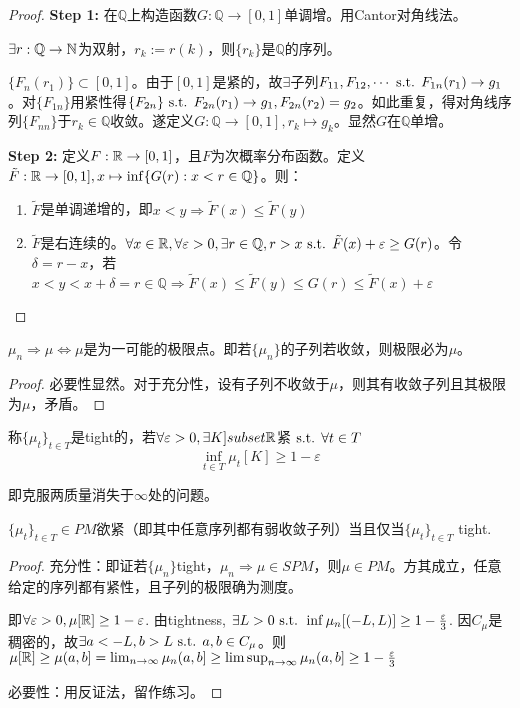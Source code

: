 \documentclass{ctexart}
\begin{document}
\begin{proof}
  \textbf{Step 1: } 在$\mathbb{Q}$上构造函数$G:\mathbb{Q}\to [0,1]$单调增。用Cantor对角线法。

  $\exists r:\mathbb{Q}\to \mathbb{N}$为双射，$r_{k}:=r(k)$，则$\{r_{k}\}$是$\mathbb{Q}$的序列。

  $\{F_{n}(r_{1})\}\subset [0,1]$。由于$[0,1]$是紧的，故$\exists $子列$F_{11},F_{12},\cdots\text{ s.t. } F_{1n}(r_{1})\to g_{1}$。对$\{F_{1n}\}$用紧性得$\{F_{2n}\}\text{ s.t. } F_{2n}(r_{1})\to g_{1},F_{2n}(r_{2})=g_{2}$。如此重复，得对角线序列$\{F_{nn}\}$于$r_{k}\in\mathbb{Q}$收敛。遂定义$G:\mathbb{Q}\to [0,1],r_{k}\mapsto g_{k}$。显然$G$在$\mathbb{Q}$单增。

\textbf{Step 2: } 定义$F:\mathbb{R}\to[0,1]$，且$F$为次概率分布函数。定义$\tilde{F}:\mathbb{R}\to [0,1],x\mapsto \inf\{G(r):x<r\in\mathbb{Q}\}$。则：
\begin{enumerate}
\item $\tilde{F}$是单调递增的，即$x<y\Rightarrow \tilde{F}(x)\leq \tilde{F}(y)$
\item $\tilde{F}$是右连续的。$\forall x\in \mathbb{R},\forall\varepsilon>0,\exists r\in\mathbb{Q},r>x\text{ s.t. } \tilde{F}(x)+\varepsilon\geq G(r)$。令$\delta=r-x$，若$x<y<x+\delta=r\in\mathbb{Q}\Rightarrow \tilde{F}(x)\leq\tilde{F}(y)\leq G(r)\leq \tilde F(x)+\varepsilon$
\end{enumerate}
\end{proof}

\begin{Cor}
  $\mu_{n}\Rightarrow \mu\Leftrightarrow \mu$是为一可能的极限点。即若$\{\mu_{n}\}$的子列若收敛，则极限必为$\mu$。
\end{Cor}

\begin{proof}
  必要性显然。对于充分性，设有子列不收敛于$\mu$，则其有收敛子列且其极限为$\mu$，矛盾。
\end{proof}

\begin{Def}[tightness]
  称$\{\mu_{t}\}_{t\in T}$是tight的，若$\forall\varepsilon>0,\exists K]subset\mathbb{R}$紧$\text{ s.t. } \forall t\in T$
  \[\inf_{t\in T}\mu_{t}[K]\geq 1-\varepsilon\]
\end{Def}
即克服两质量消失于$\infty$处的问题。

\begin{Thm}
  $\{\mu_{t}\}_{t\in T}\in PM$欲紧（即其中任意序列都有弱收敛子列）当且仅当$\{\mu_{t}\}_{t\in T}$ tight.
\end{Thm}
\begin{proof}
  充分性：即证若$\{\mu_{n}\}$tight，$\mu_{n}\Rightarrow \mu\in SPM$，则$\mu\in PM$。方其成立，任意给定的序列都有紧性，且子列的极限确为测度。

  即$\forall\varepsilon>0,\mu[\mathbb{R}]\geq 1-\varepsilon$. 由tightness, $\exists L>0\text{ s.t. } \inf\mu_{n}[(-L,L)]\geq 1-\frac{\varepsilon}{3}$. 因$C_{\mu}$是稠密的，故$\exists a<-L,b>L\text{ s.t. } a,b\in C_{\mu}$。则$\mu[\mathbb{R}]\geq \mu(a,b]=\lim_{n\to\infty}\mu_{n}(a,b]\geq\limsup_{n\to\infty}\mu_{n}(a,b]\geq 1-\frac{\varepsilon}{3}$

  必要性：用反证法，留作练习。
\end{proof}
\end{document}
